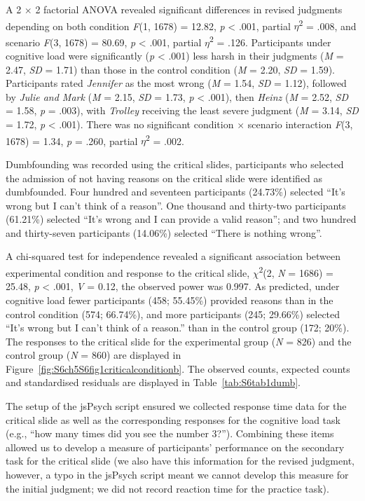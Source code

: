 \documentclass[
  man,floatsintext]{apa6}
\begin{document}
A 2 \(\times\) 2 factorial ANOVA revealed significant differences in revised judgments depending on both condition \emph{F}(1, 1678) = 12.82, \emph{p} \textless{} .001, partial \(\eta\)\textsuperscript{2} = .008, and scenario \emph{F}(3, 1678) = 80.69, \emph{p} \textless{} .001, partial \(\eta\)\textsuperscript{2} = .126. Participants under cognitive load were significantly (\emph{p} \textless{} .001) less harsh in their judgments (\emph{M} = 2.47, \emph{SD} = 1.71) than those in the control condition (\emph{M} = 2.20, \emph{SD} = 1.59). Participants rated \emph{Jennifer} as the most wrong (\emph{M} = 1.54, \emph{SD} = 1.12), followed by \emph{Julie and Mark} (\emph{M} = 2.15, \emph{SD} = 1.73, \emph{p} \textless{} .001), then \emph{Heinz} (\emph{M} = 2.52, \emph{SD} = 1.58, \emph{p} = .003), with \emph{Trolley} receiving the least severe judgment (\emph{M} = 3.14, \emph{SD} = 1.72, \emph{p} \textless{} .001). There was no significant condition \(\times\) scenario interaction \emph{F}(3, 1678) = 1.34, \emph{p} = .260, partial \(\eta\)\textsuperscript{2} = .002.

Dumbfounding was recorded using the critical slides, participants who selected the admission of not having reasons on the critical slide were identified as dumbfounded. Four hundred and seventeen participants (24.73\%) selected ``It's wrong but I can't think of a reason''. One thousand and thirty-two participants (61.21\%) selected ``It's wrong and I can provide a valid reason''; and two hundred and thirty-seven participants (14.06\%) selected ``There is nothing wrong''.

A chi-squared test for independence revealed a significant association between experimental condition and response to the critical slide, \(\chi\)\textsuperscript{2}(2, \emph{N} = 1686) = 25.48, \emph{p} \textless{} .001, \emph{V} = 0.12, the observed power was 0.997. As predicted, under cognitive load fewer participants (458; 55.45\%) provided reasons than in the control condition (574; 66.74\%), and more participants (245; 29.66\%) selected ``It's wrong but I can't think of a reason.'' than in the control group (172; 20\%). The responses to the critical slide for the experimental group (\emph{N} = 826) and the control group (\emph{N} = 860) are displayed in Figure~\ref{fig:S6ch5S6fig1criticalconditionb}. The observed counts, expected counts and standardised residuals are displayed in Table~\ref{tab:S6tab1dumb}.

The setup of the jsPsych script ensured we collected response time data for the critical slide as well as the corresponding responses for the cognitive load task (e.g., ``how many times did you see the number 3?''). Combining these items allowed us to develop a measure of participants' performance on the secondary task for the critical slide (we also have this information for the revised judgment, however, a typo in the jsPsych script meant we cannot develop this measure for the initial judgment; we did not record reaction time for the practice task).
\end{document}
